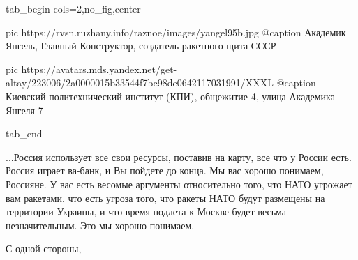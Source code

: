 \ifcmt
  tab_begin cols=2,no_fig,center

     pic https://rvsn.ruzhany.info/raznoe/images/yangel95b.jpg
		 @caption Академик Янгель, Главный Конструктор, создатель ракетного щита СССР

		 pic https://avatars.mds.yandex.net/get-altay/223006/2a0000015b33544f7bc98de0642117031991/XXXL
		 @caption Киевский политехнический институт (КПИ), общежитие 4, улица Академика Янгеля 7

  tab_end
\fi

...Россия использует все свои ресурсы, поставив на карту, все что у России
есть. Россия играет ва-банк, и Вы пойдете до конца. Мы вас хорошо понимаем,
Россияне. У вас есть весомые аргументы относительно того, что НАТО угрожает вам
ракетами, что есть угроза того, что ракеты НАТО будут размещены на территории
Украины, и что время подлета к Москве будет весьма незначительным. Это мы
хорошо понимаем. 

С одной стороны,
